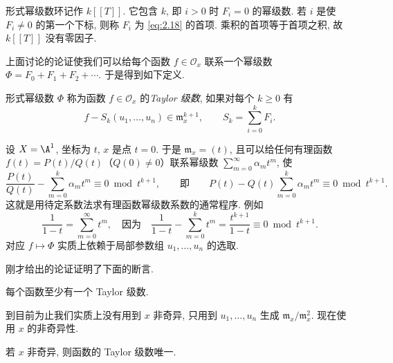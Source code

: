 形式幂级数环记作 $k[[T]]$. 它包含 $k$, 即 $i > 0$ 时 $F_i = 0$ 的幂级数. 若 $i$ 是使 $F_i \ne 0$ 的第一个下标, 则称 $F_i$ 为 \eqref{eq:2.18} 的首项. 乘积的首项等于首项之积, 故 $k[[T]]$ 没有零因子.

上面讨论的论证使我们可以给每个函数 $f \in \mathcal O_x$ 联系一个幂级数 $\Phi = F_0 + F_1 + F_2 + \cdots$. 于是得到如下定义.

\begin{definition}[Taylor 级数]\label{def:taylor-series}
	形式幂级数 $\Phi$ 称为函数 $f \in \mathcal O_x$ 的\emph{Taylor 级数}, 如果对每个 $k \ge 0$ 有
	\begin{equation}
		\label{eq:2.19}
		f - S_k(u_1, \ldots, u_n) \in \mathfrak m_x^{k+1}, \qquad S_k = \sum_{i=0}^{k} F_i.
	\end{equation}
\end{definition}

\begin{example}\label{exam:taylor-A1}
	设 $X = \A^1$, 坐标为 $t$, $x$ 是点 $t = 0$. 于是 $\mathfrak m_x = (t)$, 且可以给任何有理函数 $f(t) = P(t)/Q(t)$（$Q(0) \ne 0$）联系幂级数 $\sum_{m=0}^{\infty} \alpha_m t^m$, 使
	\[
		\frac{P(t)}{Q(t)} - \sum_{m=0}^{k} \alpha_m t^m \equiv 0 \bmod t^{k+1},
		\qquad\text{即}\qquad
		P(t) - Q(t) \sum_{m=0}^{k} \alpha_m t^m \equiv 0 \bmod t^{k+1}.
	\]
	这就是用待定系数法求有理函数幂级数系数的通常程序. 例如
	\[
		\frac{1}{1-t} = \sum_{m=0}^{\infty} t^m, \quad\text{因为}\quad \frac{1}{1-t} - \sum_{m=0}^{k} t^m = \frac{t^{k+1}}{1-t} \equiv 0 \bmod t^{k+1}.
	\]
	对应 $f \mapsto \Phi$ 实质上依赖于局部参数组 $u_1, \ldots, u_n$ 的选取.
\end{example}

刚才给出的论证证明了下面的断言.

\begin{theorem}\label{thm:taylor-exists}
	每个函数至少有一个 Taylor 级数.
\end{theorem}

到目前为止我们实质上没有用到 $x$ 非奇异, 只用到 $u_1, \ldots, u_n$ 生成 $\mathfrak m_x/\mathfrak m_x^2$. 现在使用 $x$ 的非奇异性.

\begin{theorem}\label{thm:taylor-unique}
	若 $x$ 非奇异, 则函数的 Taylor 级数唯一.
\end{theorem}

